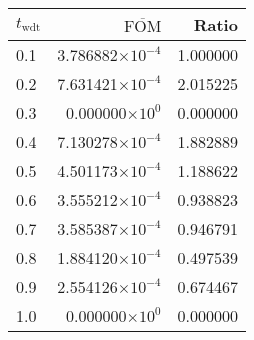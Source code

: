 \begin{tabular}{lrr}
\toprule
$t_{\mathrm{wdt}}$ & $\overline{\mathrm{FOM}}$ &    Ratio \\
\midrule
               0.1 &  3.786882$\times 10^{-4}$ & 1.000000 \\
               0.2 &  7.631421$\times 10^{-4}$ & 2.015225 \\
               0.3 &   0.000000$\times 10^{0}$ & 0.000000 \\
               0.4 &  7.130278$\times 10^{-4}$ & 1.882889 \\
               0.5 &  4.501173$\times 10^{-4}$ & 1.188622 \\
               0.6 &  3.555212$\times 10^{-4}$ & 0.938823 \\
               0.7 &  3.585387$\times 10^{-4}$ & 0.946791 \\
               0.8 &  1.884120$\times 10^{-4}$ & 0.497539 \\
               0.9 &  2.554126$\times 10^{-4}$ & 0.674467 \\
               1.0 &   0.000000$\times 10^{0}$ & 0.000000 \\
\bottomrule
\end{tabular}
